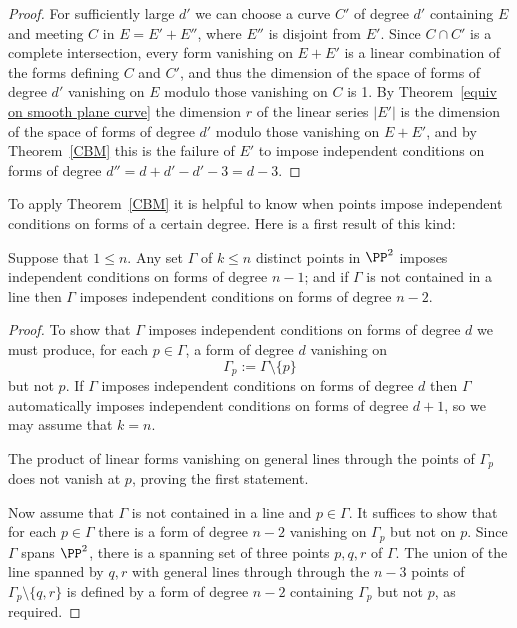 \begin{proof}
For sufficiently large $d'$ we can choose a curve $C'$ of degree $d'$ containing
$E$ and meeting $C$ in $E = E'+E''$, where $E''$ is disjoint from $E'$. Since $C\cap C'$
is a complete intersection, every form vanishing on $E+E'$ is a linear combination of
the forms defining $C$ and $C'$, and thus the dimension of the space of forms of degree $d'$
vanishing on $E$ modulo those vanishing on $C$ is 1. By Theorem~\ref{equiv on smooth plane curve} the dimension $r$ of the linear series $|E'|$ is the dimension of the space of
forms of degree $d'$ modulo those vanishing on $E+E'$, and by Theorem~\ref{CBM} this
is the failure of $E'$ to impose independent conditions on forms of degree
$d'' = d+d' - d' -3 = d-3$.
\end{proof}

To apply Theorem~\ref{CBM} it is helpful to know when points impose independent conditions on forms of a certain degree. Here is a first result of this kind:

\begin{proposition}\label{n-2 independence}
Suppose that $1\leq n$. Any set $\Gamma$ of $k\leq n$ distinct points in $\PP^{2}$ imposes independent conditions on forms of degree $n-1$; and if $\Gamma$ is not contained in a line then $\Gamma$ imposes independent conditions on forms of degree $n-2$.
\end{proposition}

\begin{proof} To show that $\Gamma$ imposes independent conditions on forms of degree $d$ we must produce, for each $p\in \Gamma$, a form of degree $d$ vanishing on 
$$
\Gamma_{p}:=\Gamma\setminus\{p\}
$$
 but not $p$. If $\Gamma$ imposes independent conditions on forms of degree $d$ then
 $\Gamma$ automatically imposes independent conditions on forms of degree $d+1$,
 so we may assume that $k=n$.
 
The product of linear forms
 vanishing on general lines through the points of $\Gamma_{p}$ does not vanish at $p$, proving the first statement.

Now assume that $\Gamma$ is not contained in a line and $p\in \Gamma$. It suffices to show that for each $p\in \Gamma$ there is a form of degree $n-2$ vanishing on $\Gamma_{p}$ but not on $p$. Since $\Gamma$ spans $\PP^2$, there is a spanning set of three points $p,q,r$ of $\Gamma$. The union of the line spanned by $q,r$ with general lines through 
through the $n-3$ points of $\Gamma_{p}\setminus\{q,r\}$ is defined by a form of degree $n-2$ containing $\Gamma_{p}$ but not $p$, 
as required. 
\end{proof}

